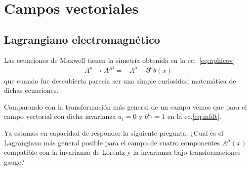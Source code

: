 \chapter{Campos vectoriales}
\label{cha:campos-vectoriales} %

 
\section{Lagrangiano electromagnético}
Las ecuaciones de Maxwell tienen la simetría obtenida en la ec.~\eqref{eq:aphicov}
\begin{align}
  \label{eq:aphicovch2}
   A^\mu\to {A'}^\mu=&A^\mu-\partial^\mu\theta(x)
\end{align}
 que cuando fue descubierta parecía ser una simple curiosidad matemática de dichas ecuaciones.

Comparando con la transformación más general de un campo vemos que para el campo vectorial con dicha invarianza $a_i=0$ y $b^{\mu_i}=1$ en la ec.\eqref{eq:infdt}. 

Ya estamos en capacidad de responder la siguiente pregunta: ¿Cual es el Lagrangiano más general posible para el campo de cuatro componentes $A^{\mu}(x)$ compatible con la invarianza de Lorentz y la invarianza bajo transformaciones gauge?


